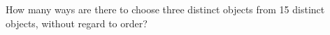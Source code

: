 How many ways are there to choose three distinct objects from 15 distinct objects, without regard to order?
